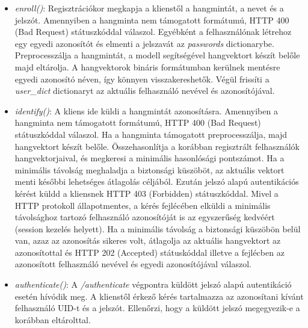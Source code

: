 \begin{itemize}
	\begin{itemize}
		\item \emph{enroll()}: Regisztrációkor megkapja a klienstől a hangmintát, a nevet és a jelszót. Amennyiben a hangminta nem támogatott formátumú, HTTP 400 (Bad Request) státuszkóddal válaszol. 
		\newline
		\newline
		Egyébként a felhasználónak létrehoz egy egyedi azonosítót és elmenti a jelszavát az \emph{passwords} dictionarybe. Preprocesszálja a hangmintát, a modell segítségével hangvektort készít belőle majd eltárolja. 
		\newline
		\newline
		A hangvektorok bináris formátumban kerülnek mentésre egyedi azonosító néven, így könnyen visszakereshetők.
		\newline
		\newline
		Végül frissíti a \emph{user\_dict} dictionaryt az aktuális felhasználó nevével és azonosítójával.
		\newline
		\item \emph{identify()}: A kliens ide küldi a hangmintát azonosításra. Amennyiben a hangminta nem támogatott formátumú, HTTP 400 (Bad Request) státuszkóddal válaszol. Ha a hangminta támogatott preprocesszálja, majd hangvektort készít belőle. Összehasonlítja a korábban regisztrált felhasználók hangvektorjaival, és megkeresi a minimális hasonlósági pontszámot. 
		\newline
		\newline
		Ha a minimális távolság meghaladja a biztonsági küszöböt, az aktuális vektort menti későbbi lehetséges átlagolás céljából. Ezután jelszó alapú autentikációs kérést küldd a kliensnek HTTP 403 (Forbidden) státuszkóddal. Mivel a HTTP protokoll állapotmentes, a kérés fejlécében elküldi a minimális távolsághoz tartozó felhasználó azonosítóját is az egyszerűség kedvéért (session kezelés helyett).
		\newline
		\newline
		Ha a minimális távolság a biztonsági küszöbön belül van, azaz az azonosítás sikeres volt, átlagolja az aktuális hangvektort az azonosítottal és HTTP 202 (Accepted) státuskóddal illetve a fejlécben az azonosított felhasználó nevével és egyedi azonosítójával válaszol.
		\newline
		\item \emph{authenticate()}: A \emph{/authenticate} végpontra küldött jelszó alapú autentikáció esetén hívódik meg. A klienstől érkező kérés tartalmazza az azonosítani kívánt felhasználó UID-t és a jelszót. Ellenőrzi, hogy a küldött jelszó megegyezik-e a korábban eltárolttal.

\end{itemize}
\end{itemize}
